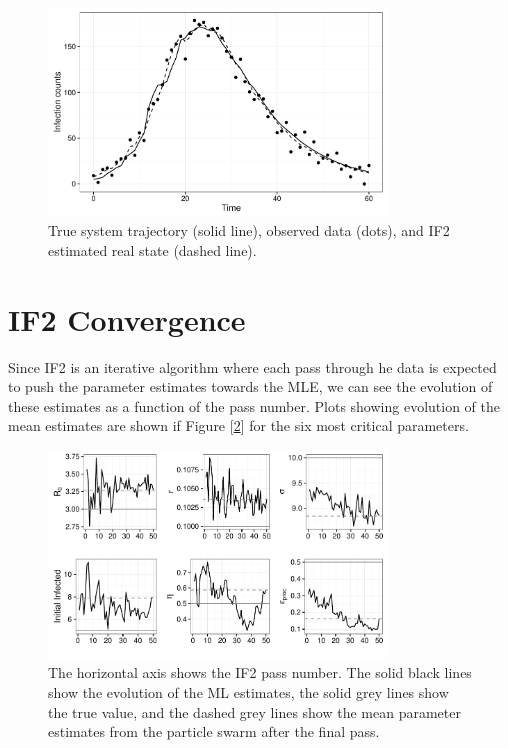 	\begin{figure}[H]
        \centering
        \captionsetup{width=.8\linewidth}
        \includegraphics[width=0.8\textwidth]{./images/if2state.pdf}
        \caption{True system trajectory (solid line), observed data (dots), and IF2 estimated real state (dashed line).}
        \label{if2state}
    \end{figure}


\section{IF2 Convergence}

	Since IF2 is an iterative algorithm where each pass through he data is expected to push the parameter estimates towards the MLE, we can see the evolution of these estimates as a function of the pass number. Plots showing evolution of the mean estimates are shown if Figure [\ref{if2convergence}] for the six most critical parameters.

	\begin{figure}[H]
        \centering
        \captionsetup{width=.8\linewidth}
        \includegraphics[width=0.8\textwidth]{./images/if2convergence.pdf}
        \caption{The horizontal axis shows the IF2 pass number. The solid black lines show the evolution of the ML estimates, the solid grey lines show the true value, and the dashed grey lines show the mean parameter estimates from the particle swarm after the final pass.}
        \label{if2convergence}
    \end{figure}

